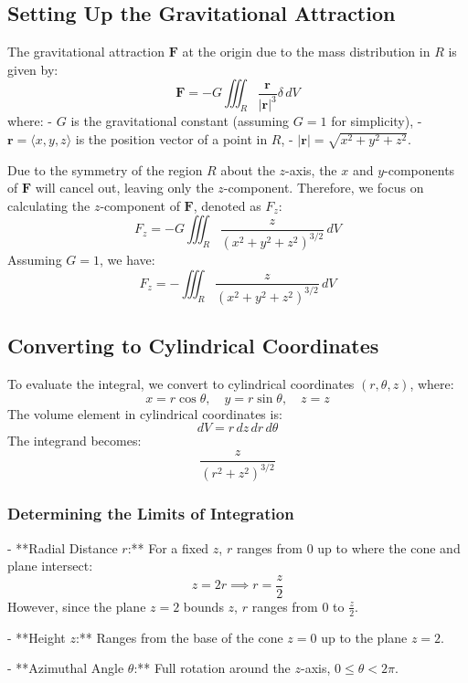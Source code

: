 \documentclass[11pt]{article}
\begin{document}
\newpage

\subsection{Setting Up the Gravitational Attraction}

The gravitational attraction \( \mathbf{F} \) at the origin due to the mass distribution in \( R \) is given by:
\[
\mathbf{F} = -G \iiint_{R} \frac{\mathbf{r}}{|\mathbf{r}|^3} \delta \, dV
\]
where:
- \( G \) is the gravitational constant (assuming \( G = 1 \) for simplicity),
- \( \mathbf{r} = \langle x, y, z \rangle \) is the position vector of a point in \( R \),
- \( |\mathbf{r}| = \sqrt{x^2 + y^2 + z^2} \).

Due to the symmetry of the region \( R \) about the \( z \)-axis, the \( x \) and \( y \)-components of \( \mathbf{F} \) will cancel out, leaving only the \( z \)-component. Therefore, we focus on calculating the \( z \)-component of \( \mathbf{F} \), denoted as \( F_z \):
\[
F_z = -G \iiint_{R} \frac{z}{(x^2 + y^2 + z^2)^{3/2}} \, dV
\]
Assuming \( G = 1 \), we have:
\[
F_z = - \iiint_{R} \frac{z}{(x^2 + y^2 + z^2)^{3/2}} \, dV
\]

\newpage

\subsection{Converting to Cylindrical Coordinates}

To evaluate the integral, we convert to cylindrical coordinates \((r, \theta, z)\), where:
\[
x = r\cos\theta, \quad y = r\sin\theta, \quad z = z
\]
The volume element in cylindrical coordinates is:
\[
dV = r \, dz \, dr \, d\theta
\]
The integrand becomes:
\[
\frac{z}{(r^2 + z^2)^{3/2}}
\]

\subsubsection*{Determining the Limits of Integration}
- **Radial Distance \( r \):** For a fixed \( z \), \( r \) ranges from \( 0 \) up to where the cone and plane intersect:
  \[
  z = 2r \implies r = \frac{z}{2}
  \]
  However, since the plane \( z = 2 \) bounds \( z \), \( r \) ranges from \( 0 \) to \( \frac{z}{2} \).

- **Height \( z \):** Ranges from the base of the cone \( z = 0 \) up to the plane \( z = 2 \).

- **Azimuthal Angle \( \theta \):** Full rotation around the \( z \)-axis, \( 0 \leq \theta < 2\pi \).
\end{document}
